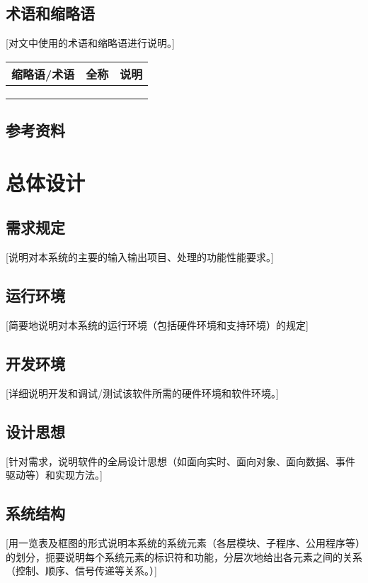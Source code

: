 \documentclass[10pt,a4paper,titlepage]{article} %
\begin{document}
\subsection{术语和缩略语}
[对文中使用的术语和缩略语进行说明。] 
\begin{center}  
\begin{tabular}{|p{3cm}<{\centering}|p{3cm}<{\centering}|p{3cm}<{\centering}|}
\hline  
缩略语/术语 & 全称 & 说明 \\  \hline  
  &  &   \\ \hline
  &  &   \\ \hline
  &  &   \\ \hline
\end{tabular}  
\end{center}  
 
\subsection{参考资料}
\section{总体设计}
\subsection{需求规定}
[说明对本系统的主要的输入输出项目、处理的功能性能要求。]\newline
\subsection{运行环境}
[简要地说明对本系统的运行环境（包括硬件环境和支持环境）的规定]\newline
\subsection{开发环境}
[详细说明开发和调试/测试该软件所需的硬件环境和软件环境。]\newline
\subsection{设计思想}
[针对需求，说明软件的全局设计思想（如面向实时、面向对象、面向数据、事件驱动等）和实现方法。]\newline
\subsection{系统结构}
[用一览表及框图的形式说明本系统的系统元素（各层模块、子程序、公用程序等）的划分，扼要说明每个系统元素的标识符和功能，分层次地给出各元素之间的关系（控制、顺序、信号传递等关系。）]\newline
\end{document}
